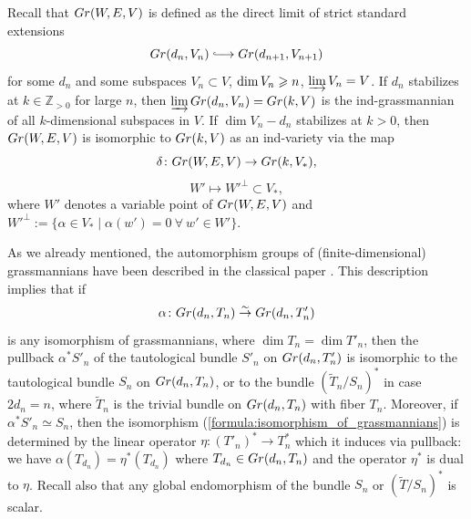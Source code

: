 \documentclass[11pt, a4paper]{article}
\begin{document}
 Recall that $Gr(W,E,V)$ is defined as the direct limit of strict standard extensions \begin{equation*}
    \Gra(d_n,V_n) \hooklongrightarrow \Gra(d_{n+1},V_{n+1})
\end{equation*}
for some $d_n$ and some subspaces $V_n\subset V$, $\dim V_n\geqslant n$, $\varinjlim V_n=V$. If $d_n$ stabilizes at $k\in\mathbb{Z}_{>0}$ for large $n$, then $\varinjlim Gr(d_n,V_n)=Gr(k,V)$ is the ind-grassmannian of all $k$-dimensional subspaces in $V$. If $\dim{V_n}-d_n$ stabilizes at $k>0$, then $Gr(W,E,V)$ is isomorphic to $Gr(k,V)$ as an ind-variety via the map
\begin{equation*}
        \delta \colon Gr(W,E,V) \rightarrow Gr(k,V_*),
\end{equation*}
\begin{equation*}
        W'\longmapsto W'^{\perp}\subset V_*,
\end{equation*}
 where $W'$ denotes a variable point of $Gr(W,E,V)$ and ${W'}^{\perp}:=\{ \alpha \in V_*\mid 
\alpha(w')=0~\forall~w' \in W' \}$.
 
As we already mentioned, the automorphism groups of (finite-dimensional) grassmannians have been described in the classical paper \cite{Chow}. This description implies that if
 \begin{equation}\label{formula:isomorphism_of_grassmannians}
     \alpha \colon Gr(d_n,T_n)\stackrel{\sim}{\rightarrow}
    Gr(d_n,T'_n)
 \end{equation}
 is any isomorphism of grassmannians, where $\dim T_n=\dim T'_n$, then the pullback $\alpha^*S'_n$ of the tautological bundle $S'_n$ on $Gr(d_n,T'_n)$ is isomorphic to the tautological bundle $S_n$ on $Gr(d_n,T_n)$, or to the bundle $(\widetilde{T}_n/S_n)^*$ in case $2d_n=n$, where $\widetilde{T}_n$ is the trivial bundle on $Gr(d_n,T_n)$ with fiber $T_n$. Moreover, if $\alpha^*S'_n\simeq S_n$, then the isomorphism (\ref{formula:isomorphism_of_grassmannians}) is determined by the linear operator $\eta \colon(T'_n)^*\rightarrow T^*_n$ which it induces via pullback: we have $\alpha(T_{d_n})=\eta^*(T_{d_n})$ where $T_{d_n}\in Gr(d_n,T_n)$ and the operator $\eta^*$ is dual to $\eta$. Recall also that any global endomorphism of the bundle $S_n$ or $(\widetilde{T}/S_n)^*$ is scalar. 
 
\end{document}
